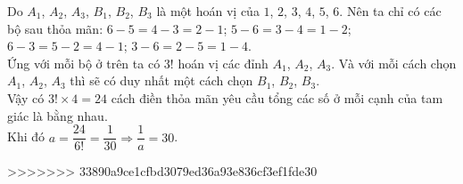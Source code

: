\begin{ex}
{{}\noindent
Do $A_1$, $A_2$, $A_3$,  $B_1$, $B_2$, $B_3$ là một hoán vị của $1$, $2$, $3$, $4$, $5$, $6$.
Nên ta chỉ có các bộ sau thỏa mãn: $6-5 = 4-3 = 2-1$; $5-6 = 3-4 = 1-2$; $6-3 = 5-2 = 4-1$; $3-6 = 2-5 = 1-4$.\\
Ứng với mỗi bộ ở trên ta có $3!$ hoán vị các đỉnh $A_1$, $A_2$, $A_3$.
Và với mỗi cách chọn $A_1$, $A_2$, $A_3$ thì sẽ có duy nhất một cách chọn $B_1$, $B_2$, $B_3$.\\
Vậy có $3!\times 4=24$ cách điền thỏa mãn yêu cầu  tổng các số ở mỗi cạnh của tam giác là bằng nhau.\\
Khi đó $a=\dfrac{\mathrm{24}}{6!}=\dfrac{1}{30}\Rightarrow \dfrac{1}{a}=30$.
}
\end{ex}

>>>>>>> 33890a9ce1cfbd3079ed36a93e836cf3ef1fde30
